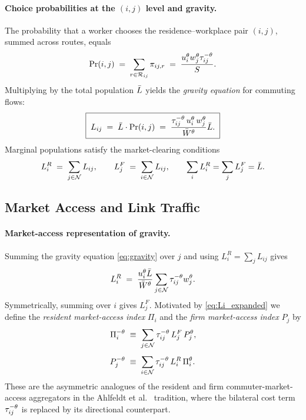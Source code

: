 \paragraph{Choice probabilities at the $(i,j)$ level and gravity.}
The probability that a worker chooses the residence--workplace pair
$(i,j)$, summed across routes, equals
\begin{equation}
  \Pr(i,j)
  \;=\;
  \sum_{r\in\mathcal R_{ij}}\pi_{ij,r}
  \;=\;
  \frac{u_i^{\theta}w_j^{\theta}\tau_{ij}^{-\theta}}{S}.
  \label{eq:probij}
\end{equation}
Multiplying by the total population $\bar L$ yields the \emph{gravity
equation} for commuting flows:
\begin{equation}
  \boxed{\;L_{ij}
  \;=\;
  \bar L\cdot\Pr(i,j)
  \;=\;
  \frac{\tau_{ij}^{-\theta}\,u_i^{\theta}\,w_j^{\theta}}{\bar W^{\theta}}\bar L.\;}
  \label{eq:gravity}
\end{equation}
Marginal populations satisfy the market-clearing conditions
\begin{equation}
  L_i^R\;=\;\sum_{j\in\mathcal N}L_{ij},
  \qquad
  L_j^F\;=\;\sum_{i\in\mathcal N}L_{ij},
  \qquad
  \sum_{i}L_i^R=\sum_{j}L_j^F=\bar L.
  \label{eq:marketclearing}
\end{equation}

\subsection{Market Access and Link Traffic}\label{ssec:ma}

\paragraph{Market-access representation of gravity.}
Summing the gravity equation \eqref{eq:gravity} over $j$ and using
$L_i^R=\sum_j L_{ij}$ gives
\begin{equation}
  L_i^R
  \;=\;\frac{u_i^{\theta}\bar L}{\bar W^{\theta}}
       \sum_{j\in\mathcal N}\tau_{ij}^{-\theta}w_j^{\theta}.
  \label{eq:Li_expanded}
\end{equation}
Symmetrically, summing over $i$ gives $L_j^F$.  Motivated by
\eqref{eq:Li_expanded} we define the \emph{resident market-access
index} $\Pi_i$ and the \emph{firm market-access index} $P_j$ by
\begin{align}
  \Pi_i^{-\theta}
  &\;\equiv\;
  \sum_{j\in\mathcal N}\tau_{ij}^{-\theta}\,L_j^F\,P_j^{\theta},
  \label{eq:Pi_def}\\[4pt]
  P_j^{-\theta}
  &\;\equiv\;
  \sum_{i\in\mathcal N}\tau_{ij}^{-\theta}\,L_i^R\,\Pi_i^{\theta}.
  \label{eq:Pj_def}
\end{align}
These are the asymmetric analogues of the resident and firm
commuter-market-access aggregators in the Ahlfeldt et al.\
\cite{Ahlfeldt2015} tradition, where the bilateral cost term
$\tau_{ij}^{-\theta}$ is replaced by its directional counterpart.

